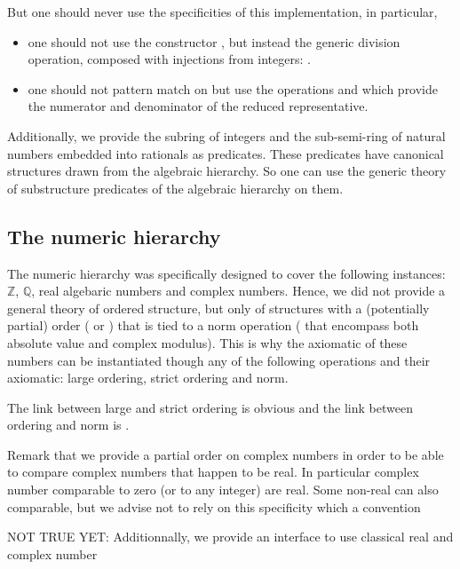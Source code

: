 But one should never use the specificities of this implementation, in
particular,
\begin{itemize}
\item one should not use the constructor , but instead the
  generic division operation, composed with injections from integers:
  .
\item one should not pattern match on  but use the operations
   and  which provide the numerator and denominator of
  the reduced representative.
\end{itemize}

Additionally, we provide the subring of integers  and the
sub-semi-ring of natural numbers  embedded into rationals as
predicates. These predicates have canonical structures drawn from the
algebraic hierarchy. So one can use the generic theory of substructure
predicates of the algebraic hierarchy on them.


\subsection{The numeric hierarchy}
\label{sec:numeric-hierarchy}

The numeric hierarchy was specifically designed to cover the following
instances: $\mathbb{Z}$, $\mathbb{Q}$, real algebaric numbers and
complex numbers. Hence, we did not provide a general theory of ordered
structure, but only of structures with a (potentially partial) order
(\C{_ <= _} or \C{_ < _}) that is tied to a norm operation (
that encompass both absolute value and complex modulus). This is why
the axiomatic of these numbers can be instantiated though any of the
following operations and their axiomatic: large ordering, strict
ordering and norm.

The link between large and strict ordering is obvious and the link
between ordering and norm is .

Remark that we provide a partial order on complex numbers in order to
be able to compare complex numbers that happen to be real. In
particular complex number comparable to zero (or to any integer) are
real. Some non-real can also comparable, but we advise not to rely on
this specificity which a convention

NOT TRUE YET: Additionnally, we provide an interface to use classical real and
complex number


